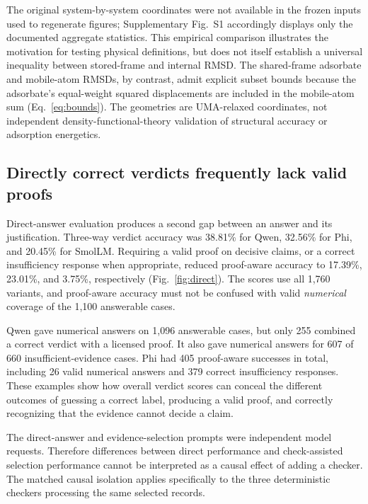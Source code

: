 The original system-by-system coordinates were not available in the frozen inputs used to regenerate figures; Supplementary Fig.~S1 accordingly displays only the documented aggregate statistics. This empirical comparison illustrates the motivation for testing physical definitions, but does not itself establish a universal inequality between stored-frame and internal RMSD. The shared-frame adsorbate and mobile-atom RMSDs, by contrast, admit explicit subset bounds because the adsorbate's equal-weight squared displacements are included in the mobile-atom sum (Eq.~\ref{eq:bounds}). The geometries are UMA-relaxed coordinates, not independent density-functional-theory validation of structural accuracy or adsorption energetics.



\subsection{Directly correct verdicts frequently lack valid proofs}
\label{sec:direct_results}

Direct-answer evaluation produces a second gap between an answer and its justification. Three-way verdict accuracy was 38.81\% for Qwen, 32.56\% for Phi, and 20.45\% for SmolLM. Requiring a valid proof on decisive claims, or a correct insufficiency response when appropriate, reduced proof-aware accuracy to 17.39\%, 23.01\%, and 3.75\%, respectively (Fig.~\ref{fig:direct}). The scores use all 1,760 variants, and proof-aware accuracy must not be confused with valid \emph{numerical} coverage of the 1,100 answerable cases.

Qwen gave numerical answers on 1,096 answerable cases, but only 255 combined a correct verdict with a licensed proof. It also gave numerical answers for 607 of 660 insufficient-evidence cases. Phi had 405 proof-aware successes in total, including 26 valid numerical answers and 379 correct insufficiency responses. These examples show how overall verdict scores can conceal the different outcomes of guessing a correct label, producing a valid proof, and correctly recognizing that the evidence cannot decide a claim.

The direct-answer and evidence-selection prompts were independent model requests. Therefore differences between direct performance and check-assisted selection performance cannot be interpreted as a causal effect of adding a checker. The matched causal isolation applies specifically to the three deterministic checkers processing the same selected records.

